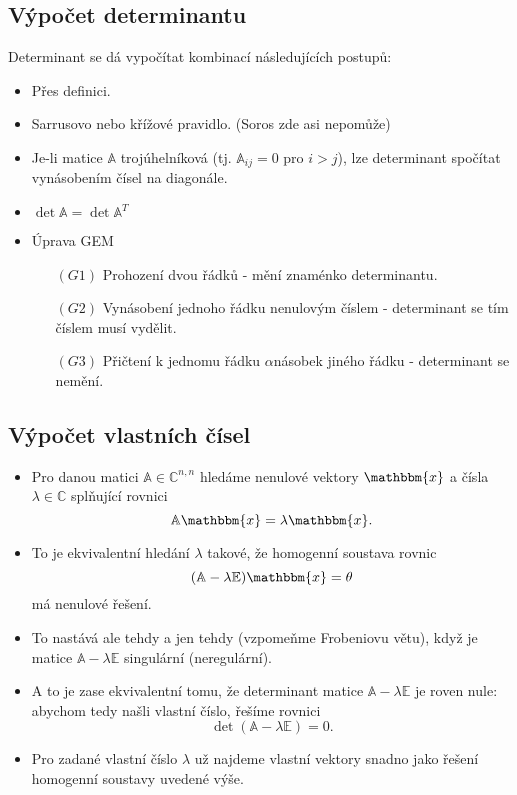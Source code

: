 \documentclass{szzclass}
\begin{document}
\subsection{Výpočet determinantu}
Determinant se dá vypočítat kombinací následujících postupů:
\begin{itemize}
\item Přes definici.
\item Sarrusovo nebo křížové pravidlo. (Soros zde asi nepomůže)
\item Je-li matice $\mathbb{A}$ trojúhelníková (tj. $\mathbb{A}_{ij} = 0$ pro $i > j$), lze determinant spočítat vynásobením čísel na diagonále.
\item $\det{\mathbb{A}}=\det{\mathbb{A}^T}$
\item Úprava GEM
  \begin{itemize}
  \item[$(G1)$] Prohození dvou řádků - mění znaménko determinantu.
  \item[$(G2)$] Vynásobení jednoho řádku nenulovým číslem - determinant se tím číslem musí vydělit.
  \item[$(G3)$] Přičtení k jednomu řádku $\alpha$násobek jiného řádku - determinant se nemění.
  \end{itemize}
\end{itemize}

\subsection{Výpočet vlastních čísel}

\begin{itemize}
\item Pro danou matici $\mathbb{A} \in \mathbb{C}^{n,n}$ hledáme nenulové vektory $\mathbbm{x}$ a čísla $\lambda\in\mathbb{C}$ splňující rovnici
\[
  \mathbb{A}\mathbbm{x} = \lambda \mathbbm{x}.
\]
\item To je ekvivalentní hledání $\lambda$ takové, že homogenní soustava rovnic
\[
  (\mathbb{A} - \lambda \mathbb{E})\mathbbm{x} = \theta
\]
má nenulové řešení.
\item To nastává ale tehdy a jen tehdy (vzpomeňme Frobeniovu větu), když je matice $\mathbb{A} - \lambda \mathbb{E}$ singulární (neregulární).
\item A to je zase ekvivalentní tomu, že determinant matice $\mathbb{A} - \lambda \mathbb{E}$ je roven nule: abychom tedy našli vlastní číslo, řešíme rovnici
\[
  \det(\mathbb{A} - \lambda \mathbb{E}) = 0.
\]
\item Pro zadané vlastní číslo $\lambda$ už najdeme vlastní vektory snadno jako řešení homogenní soustavy uvedené výše.
\end{itemize}
\end{document}
